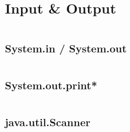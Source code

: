 \documentclass[
  11pt, %
  xcolor=dvipsnames
]{beamer}
\begin{document}

\section{Input \& Output}
\begin{frame}[fragile]

	\begin{columns}[c]
		\begin{column}{0.9\textwidth}


		\end{column}
	\end{columns}

\end{frame}

\subsection{System.in / System.out}
\begin{frame}[fragile]

	\begin{columns}[c]
		\begin{column}{0.9\textwidth}


		\end{column}
	\end{columns}

\end{frame}

\subsection{System.out.print*}
\begin{frame}[fragile]

	\begin{columns}[c]
		\begin{column}{0.9\textwidth}


		\end{column}
	\end{columns}

\end{frame}

\subsection{java.util.Scanner}
\begin{frame}[fragile]

	\begin{columns}[c]
		\begin{column}{0.9\textwidth}


		\end{column}
	\end{columns}

\end{frame}
\end{document}
